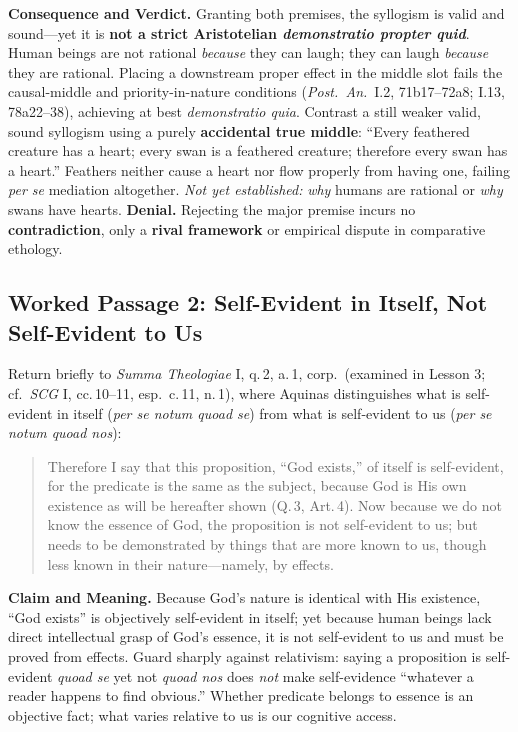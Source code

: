 \textbf{Consequence and Verdict.} Granting both premises, the syllogism is valid and sound---yet it is \textbf{not a strict Aristotelian \emph{demonstratio propter quid}}. Human beings are not rational \emph{because} they can laugh; they can laugh \emph{because} they are rational. Placing a downstream proper effect in the middle slot fails the causal-middle and priority-in-nature conditions (\emph{Post.\ An.}\ I.2, 71b17--72a8; I.13, 78a22--38), achieving at best \emph{demonstratio quia}. Contrast a still weaker valid, sound syllogism using a purely \textbf{accidental true middle}: ``Every feathered creature has a heart; every swan is a feathered creature; therefore every swan has a heart.'' Feathers neither cause a heart nor flow properly from having one, failing \emph{per se} mediation altogether. \emph{Not yet established:} \emph{why} humans are rational or \emph{why} swans have hearts. \textbf{Denial.} Rejecting the major premise incurs no \textbf{contradiction}, only a \textbf{rival framework} or empirical dispute in comparative ethology.

\subsection{Worked Passage 2: Self-Evident in Itself, Not Self-Evident to Us}

Return briefly to \emph{Summa Theologiae} I, q.\,2, a.\,1, corp.\ (examined in Lesson 3; cf.\ \emph{SCG} I, cc.\,10--11, esp.\ c.\,11, n.\,1), where Aquinas distinguishes what is self-evident in itself (\emph{per se notum quoad se}) from what is self-evident to us (\emph{per se notum quoad nos}):

\begin{quote}
Therefore I say that this proposition, ``God exists,'' of itself is self-evident, for the predicate is the same as the subject, because God is His own existence as will be hereafter shown (Q.\,3, Art.\,4). Now because we do not know the essence of God, the proposition is not self-evident to us; but needs to be demonstrated by things that are more known to us, though less known in their nature---namely, by effects.
\end{quote}

\textbf{Claim and Meaning.} Because God's nature is identical with His existence, ``God exists'' is objectively self-evident in itself; yet because human beings lack direct intellectual grasp of God's essence, it is not self-evident to us and must be proved from effects. Guard sharply against relativism: saying a proposition is self-evident \emph{quoad se} yet not \emph{quoad nos} does \emph{not} make self-evidence ``whatever a reader happens to find obvious.'' Whether predicate belongs to essence is an objective fact; what varies relative to us is our cognitive access.

